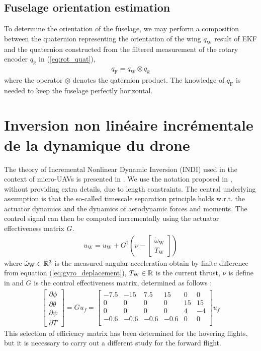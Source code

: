 \subsection{Fuselage orientation estimation}
To determine the orientation of the fuselage, we may perform a composition between the quaternion representing the orientation of the wing $q_{\text{W}}$ result of EKF and the quaternion constructed from the filtered measurement of the rotary encoder $q_{\hat{\kappa}}$ in (\ref{eq:rot_quat}),
\begin{align}
\label{eq:quat_fuselage}
    q_{\text{F}} = q_{\text{W}} \otimes q_{\hat{\kappa}}
\end{align}
where the operator $\otimes$ denotes the qaternion product. The knowledge of $q_{\text{F}}$ is needed to keep the fuselage perfectly horizontal. 

\section{Inversion non linéaire incrémentale de la dynamique du drone}
The theory of Incremental Nonlinear Dynamic Inversion (INDI) used in the context of micro-UAVs is presented in \cite{smeurINDI}. We use the notation proposed in \cite{smeurINDITail}, without providing extra details, due to length constraints. The central underlying assumption is that the so-called timescale separation principle holds w.r.t. the actuator dynamics and the dynamics of aerodynamic forces and moments. The control signal can then be computed incrementally using the actuator effectiveness matrix $G$.
\begin{align}
    u_{\text{W}} = u_{\text{W}} + G^{\dag} (\nu - \begin{bmatrix}
    \dot{\omega}_{\text{W}} \\
    T_{\text{W}}
    \end{bmatrix})
\end{align}
where $ \dot{\omega}_{\text{W}} \in {\mathbb R}^{3}$ is the measured angular acceleration obtain by finite difference from equation (\ref{eq:gyro_deplacement}), $T_{\text{W}} \in {\mathbb R}$ is the current thrust, $\nu$ is define in \cite[equation (4)]{smeurINDITail} and $G$ is the control effectiveness matrix, determined as follows :
\begin{align*}
    \begin{bmatrix}
    \partial \phi \\
    \partial \theta \\
    \partial \psi \\
    \partial T
    \end{bmatrix}\! =\! G u_{f} \!=\!
    \begin{bmatrix}
    -7.5 & -15 & 7.5 & 15 & 0 & 0\\
    0 & 0 & 0 & 0 & 15 & 15 \\
    0 & 0 & 0 & 0 & 4 & -4 \\
    -0.6 & -0.6 & -0.6 & -0.6 & 0 & 0\\
    \end{bmatrix}
    u_{f}
\end{align*}
This selection of efficiency matrix has been determined for the hovering flights, but it is necessary to carry out a different study for the forward flight.


